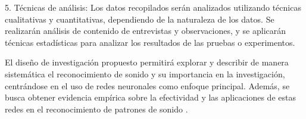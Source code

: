 5. Técnicas de análisis: Los datos recopilados serán analizados utilizando técnicas cualitativas y cuantitativas, dependiendo de la naturaleza de los datos. Se realizarán análisis de contenido de entrevistas y observaciones, y se aplicarán técnicas estadísticas para analizar los resultados de las pruebas o experimentos.

El diseño de investigación propuesto permitirá explorar y describir de manera sistemática el reconocimiento de sonido y su importancia en la investigación, centrándose en el uso de redes neuronales como enfoque principal. Además, se busca obtener evidencia empírica sobre la efectividad y las aplicaciones de estas redes en el reconocimiento de patrones de sonido \cite{ues, martinez, osorio, frro2, apple}.
